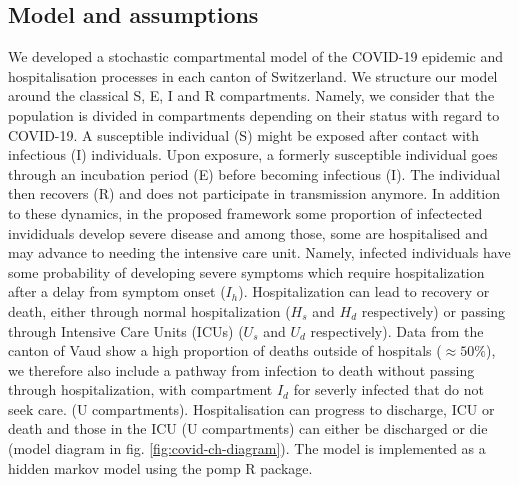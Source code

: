 \subsection{Model and assumptions}
We developed a stochastic compartmental model of the COVID-19 epidemic and hospitalisation processes in each canton of Switzerland. We structure our model around the classical S, E, I and R compartments\cite{Kermack:ContributionMathematicalTheory:1927}. Namely, we consider that the population is divided in compartments depending on their status with regard to COVID-19. A susceptible individual (S) might be exposed after contact with infectious (I) individuals. Upon exposure, a formerly susceptible individual goes through an incubation period (E) before becoming infectious (I). The individual then recovers (R) and does not participate in transmission anymore. In addition to these dynamics, in the proposed framework some proportion of infectected invididuals develop severe disease and among those, some are hospitalised and may advance to needing the intensive care unit. Namely, infected individuals have some probability of developing severe symptoms which require hospitalization after a delay from symptom onset ($I_h$). Hospitalization can lead to recovery or death, either through normal hospitalization ($H_{s}$ and $H_d$ respectively) or passing through Intensive Care Units (ICUs) ($U_{s}$ and $U_d$ respectively). Data from the canton of Vaud show a high proportion of deaths outside of hospitals ($\approx 50\%$), we therefore also include a pathway from infection to death without passing through hospitalization, with compartment $I_d$ for severly infected that do not seek care. 
 (U compartments). Hospitalisation can progress to discharge, ICU or death and those in the ICU (U compartments) can either be discharged or die (model diagram in fig. \ref{fig:covid-ch-diagram}).  The model is implemented as a hidden markov model using the pomp R package\cite{King:StatisticalInferencePartially:2015}. 
